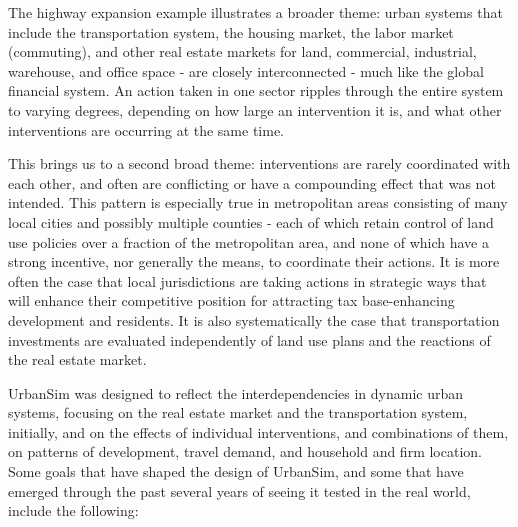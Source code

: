 The highway expansion example illustrates a broader theme: urban systems that include the transportation system, the housing market, the labor market (commuting), and other real estate markets for land, commercial, industrial, warehouse, and office space - are closely interconnected - much like the global financial system. An action taken in one sector ripples through the entire system to varying degrees, depending on how large an intervention it is, and what other interventions are occurring at the same time.

This brings us to a second broad theme: interventions are rarely coordinated with each other, and often are conflicting or have a compounding effect that was not intended. This pattern is especially true in metropolitan areas consisting of many local cities and possibly multiple counties - each of which retain control of land use policies over a fraction of the metropolitan area, and none of which have a strong incentive, nor generally the means, to coordinate their actions. It is more often the case that local jurisdictions are taking actions in strategic ways that will enhance their competitive position for attracting tax base-enhancing development and residents. It is also systematically the case that transportation investments are evaluated independently of land use plans and the reactions of the real estate market.

UrbanSim was designed to reflect the interdependencies in dynamic urban systems, focusing on the real estate market and the transportation system, initially, and on the effects of individual interventions, and combinations of them, on patterns of development, travel demand, and household and firm location. Some goals that have shaped the design of UrbanSim, and some that have emerged through the past several years of seeing it tested in the real world, include the following:

